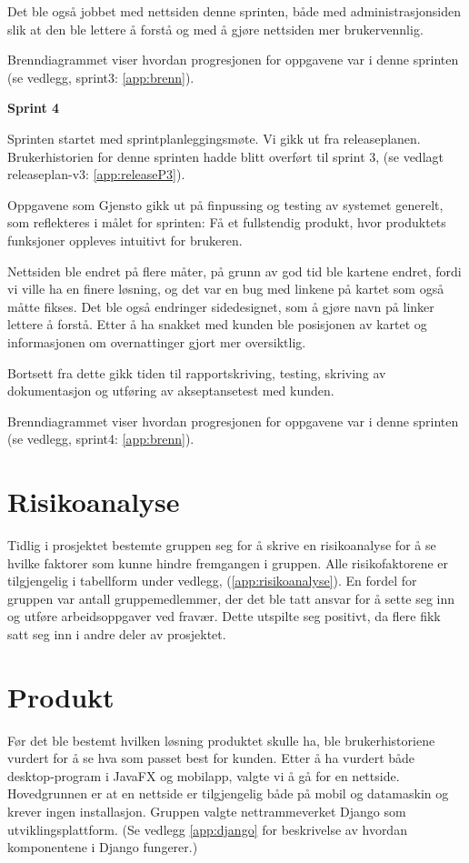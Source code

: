 \documentclass[12pt,a4paper,norsk]{article}
\begin{document}
Det ble også jobbet med nettsiden denne sprinten, både med administrasjonsiden slik at den ble lettere å forstå og med å gjøre nettsiden mer brukervennlig.

Brenndiagrammet viser hvordan progresjonen for oppgavene var i denne sprinten (se vedlegg, sprint3: \cref{app:brenn}).

\bigskip \noindent \textbf{Sprint 4}
\par Sprinten startet med sprintplanleggingsmøte. Vi gikk ut fra releaseplanen. Brukerhistorien for denne sprinten hadde blitt overført til sprint 3, (se vedlagt releaseplan-v3: \cref{app:releaseP3}).
\par Oppgavene som Gjensto gikk ut på finpussing og testing av systemet generelt, som reflekteres i målet for sprinten: Få et fullstendig produkt, hvor produktets funksjoner oppleves intuitivt for brukeren.

Nettsiden ble endret på flere måter, på grunn av god tid ble kartene endret, fordi vi ville ha en finere løsning, og det var en bug med linkene på kartet som også måtte fikses. Det ble også endringer sidedesignet, som å gjøre navn på linker lettere å forstå. Etter å ha snakket med kunden ble posisjonen av kartet og informasjonen om overnattinger gjort mer oversiktlig.

Bortsett fra dette gikk tiden til rapportskriving, testing, skriving av dokumentasjon og utføring av akseptansetest med kunden.

Brenndiagrammet viser hvordan progresjonen for oppgavene var i denne sprinten (se vedlegg, sprint4: \cref{app:brenn}).


  \section{Risikoanalyse}
  Tidlig i prosjektet bestemte gruppen seg for å skrive en risikoanalyse for å se hvilke faktorer som kunne hindre fremgangen i gruppen. Alle risikofaktorene er tilgjengelig i tabellform under vedlegg, (\cref{app:risikoanalyse}). En fordel for gruppen var antall gruppemedlemmer, der det ble tatt ansvar for å sette seg inn og utføre arbeidsoppgaver ved fravær. Dette utspilte seg positivt, da flere fikk satt seg inn i andre deler av prosjektet.

  \section{Produkt}
  Før det ble bestemt hvilken løsning produktet skulle ha, ble brukerhistoriene vurdert for å se hva som passet best for kunden. Etter å ha vurdert både desktop-program i JavaFX og mobilapp, valgte vi å gå for en nettside. Hovedgrunnen er at en nettside er tilgjengelig både på mobil og datamaskin og krever ingen installasjon. Gruppen valgte nettrammeverket Django som utviklingsplattform. (Se vedlegg \cref{app:django} for beskrivelse av hvordan komponentene i Django fungerer.)
\end{document}
